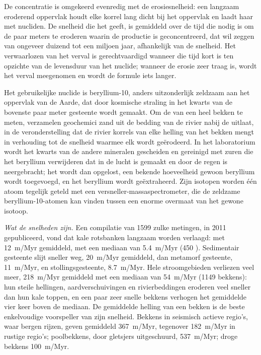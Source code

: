 De concentratie is omgekeerd evenredig met de erosiesnelheid: een langzaam eroderend oppervlak houdt elke korrel lang dicht bij het oppervlak en laadt haar met nucliden. De snelheid die het geeft, is gemiddeld over de tijd die nodig is om de paar meters te eroderen waarin de productie is geconcentreerd, dat wil zeggen van ongeveer duizend tot een miljoen jaar, afhankelijk van de snelheid. Het verwaarlozen van het verval is gerechtvaardigd wanneer die tijd kort is ten opzichte van de levensduur van het nuclide; wanneer de erosie zeer traag is, wordt het verval meegenomen en wordt de formule iets langer.

\begin{inthelab}
Het gebruikelijke nuclide is beryllium-10, anders uitzonderlijk zeldzaam aan het oppervlak van de Aarde, dat door kosmische straling in het kwarts van de bovenste paar meter gesteente wordt gemaakt. Om de  van een heel bekken te meten, verzamelen geochemici zand uit de bedding van de rivier nabij de uitlaat, in de veronderstelling dat de rivier korrels van elke helling van het bekken mengt in verhouding tot de snelheid waarmee elk wordt geërodeerd. In het laboratorium wordt het kwarts van de andere mineralen gescheiden en gereinigd met zuren die het beryllium verwijderen dat in de lucht is gemaakt en door de regen is neergebracht; het wordt dan opgelost, een bekende hoeveelheid gewoon beryllium wordt toegevoegd, en het beryllium wordt geëxtraheerd. Zijn isotopen worden één atoom tegelijk geteld met een versneller-massaspectrometer, die de zeldzame beryllium-10-atomen kan vinden tussen een enorme overmaat van het gewone isotoop.
\end{inthelab}

\emph{Wat de snelheden zijn.} Een compilatie van \num{1599} zulke metingen, in 2011 gepubliceerd, vond dat kale rotsbanken langzaam worden verlaagd: met \qty{12}{m/Myr} gemiddeld, met een mediaan van \qty{5.4}{m/Myr} (450 ). Sedimentair gesteente slijt sneller weg, \qty{20}{m/Myr} gemiddeld, dan metamorf gesteente, \qty{11}{m/Myr}, en stollingsgesteente, \qty{8.7}{m/Myr}. Hele stroomgebieden verliezen veel meer, \qty{218}{m/Myr} gemiddeld met een mediaan van \qty{54}{m/Myr} (\num{1149} bekkens): hun steile hellingen, aardverschuivingen en rivierbeddingen eroderen veel sneller dan hun kale toppen, en een paar zeer snelle bekkens verhogen het gemiddelde vier keer boven de mediaan. De gemiddelde helling van een bekken is de beste enkelvoudige voorspeller van zijn snelheid. Bekkens in seismisch actieve regio's, waar bergen rijzen, geven gemiddeld \qty{367}{m/Myr}, tegenover \qty{182}{m/Myr} in rustige regio's; poolbekkens, door gletsjers uitgeschuurd, \qty{537}{m/Myr}; droge bekkens \qty{100}{m/Myr}.

